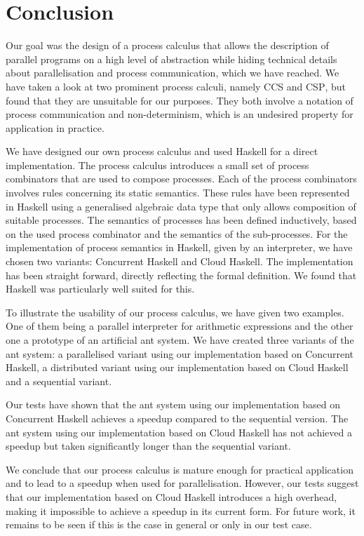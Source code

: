 \chapter{Conclusion}
\vspace*{-0.5em}
Our goal was the design of a process calculus that allows the description of parallel programs on a high level of abstraction while hiding technical details about parallelisation and process communication, which we have reached. We have taken a look at two prominent process calculi, namely \textsc{CCS} and \textsc{CSP}, but found that they are unsuitable for our purposes. They both involve a notation of process communication and non-determinism, which is an undesired property for application in practice.

\vspace*{-0.25em}
We have designed our own process calculus and used \textsf{Haskell} for a direct implementation. The process calculus introduces a small set of process combinators that are used to compose processes. Each of the process combinators involves rules concerning its static semantics. These rules have been represented in \textsf{Haskell} using a generalised algebraic data type that only allows composition of suitable processes. The semantics of processes has been defined inductively, based on the used process combinator and the semantics of the sub-processes. For the implementation of process semantics in \textsf{Haskell}, given by an interpreter, we have chosen two variants: \textsf{Concurrent Haskell} and \textsf{Cloud Haskell}. The implementation has been straight forward, directly reflecting the formal definition. We found that \textsf{Haskell} was particularly well suited for this.

\vspace*{-0.25em}
To illustrate the usability of our process calculus, we have given two examples. One of them being a parallel interpreter for arithmetic expressions and the other one a prototype of an artificial ant system. We have created three variants of the ant system: a parallelised variant using our implementation based on \textsf{Concurrent Haskell}, a distributed variant using our implementation based on \textsf{Cloud Haskell} and a sequential variant.

\vspace*{-0.25em}
Our tests have shown that the ant system using our implementation based on \textsf{Concurrent Haskell} achieves a speedup compared to the sequential version. The ant system using our implementation based on \textsf{Cloud Haskell} has not achieved a speedup but taken significantly longer than the sequential variant. 

\vspace*{-0.25em}
We conclude that our process calculus is mature enough for practical application and to lead to a speedup when used for parallelisation. However, our tests suggest that our implementation based on \textsf{Cloud Haskell} introduces a high overhead, making it impossible to achieve a speedup in its current form. For future work, it remains to be seen if this is the case in general or only in our test case.
\vspace*{-0.5em}